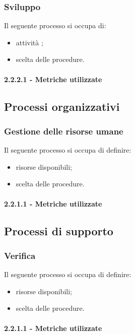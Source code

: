 \subsubsection{Sviluppo}
Il seguente processo si occupa di:
\begin{itemize}
    \item attività ;
    \item scelta delle procedure.
\end{itemize}
\paragraph{2.2.2.1 - Metriche utilizzate}

\subsection{Processi organizzativi}

\subsubsection{Gestione delle risorse umane}
Il seguente processo si occupa di definire:
\begin{itemize}
    \item risorse disponibili;
    \item scelta delle procedure.
\end{itemize}
\paragraph{2.2.1.1 - Metriche utilizzate}

\subsection{Processi di supporto}

\subsubsection{Verifica}
Il seguente processo si occupa di definire:
\begin{itemize}
    \item risorse disponibili;
    \item scelta delle procedure.
\end{itemize}
\paragraph{2.2.1.1 - Metriche utilizzate}

